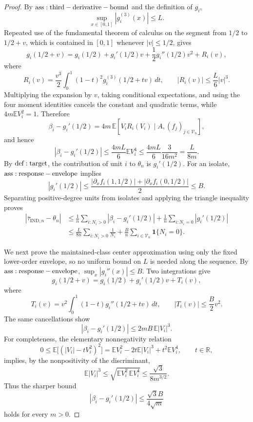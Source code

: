 \documentclass{article}
\begin{document}
\begin{proof}
By \({\rm ass:third-derivative-bound}\) and the definition of \(g_i\),
\[
 \sup_{x\in[0,1]}|g_i^{(3)}(x)|\le L.
\]
Repeated use of the fundamental theorem of calculus on the segment from \(1/2\) to \(1/2+v\), which is contained in \([0,1]\) whenever \(|v|\le1/2\), gives
\[
 g_i(1/2+v)
 =g_i(1/2)+g_i'(1/2)v+\frac12g_i''(1/2)v^2+R_i(v),
\]
where
\[
 R_i(v)=\frac{v^3}{2}\int_0^1(1-t)^2g_i^{(3)}(1/2+tv)\,dt,
 \qquad
 |R_i(v)|\le\frac L6|v|^3.
\]
Multiplying the expansion by \(v\), taking conditional expectations, and using the four moment identities cancels the constant and quadratic terms, while \(4m\mathbb E V_i^2=1\).  Therefore
\[
 \beta_i-g_i'(1/2)
 =4m\,\mathbb E\!\left[V_iR_i(V_i)\mid A,(f_j)_{j\in\mathcal V_n}\right],
\]
and hence
\[
 |\beta_i-g_i'(1/2)|
 \le\frac{4mL}{6}\mathbb E V_i^4
 \le\frac{4mL}{6}\frac3{16m^2}
 =\frac{L}{8m}.
\]
By \({\rm def:target}\), the contribution of unit \(i\) to \(\theta_n\) is \(g_i'(1/2)\).  For an isolate, \({\rm ass:response-envelope}\) implies
\[
 |g_i'(1/2)|
 \le\frac{|\partial_xf_i(1,1/2)|+|\partial_xf_i(0,1/2)|}{2}
 \le B.
\]
Separating positive-degree units from isolates and applying the triangle inequality proves
\[
\begin{aligned}
 |\bar\tau_{\mathrm{IND},n}-\theta_n|
 &\le\frac1n\sum_{i:N_i>0}|\beta_i-g_i'(1/2)|
       +\frac1n\sum_{i:N_i=0}|g_i'(1/2)|\\
 &\le\frac{L}{8n}\sum_{i:N_i>0}\frac1{N_i}
       +\frac Bn\sum_{i\in\mathcal V_n}\mathbf1\{N_i=0\}.
\end{aligned}
\]

We next prove the maintained-class center approximation using only the fixed lower-order envelope, so no uniform bound on \(L\) is needed along the sequence.  By \({\rm ass:response-envelope}\), \(\sup_x|g_i''(x)|\le B\).  Two integrations give
\[
 g_i(1/2+v)=g_i(1/2)+g_i'(1/2)v+T_i(v),
\]
where
\[
 T_i(v)=v^2\int_0^1(1-t)g_i''(1/2+tv)\,dt,
 \qquad
 |T_i(v)|\le\frac B2v^2.
\]
The same cancellations show
\[
 |\beta_i-g_i'(1/2)|\le2mB\,\mathbb E|V_i|^3.
\]
For completeness, the elementary nonnegativity relation
\[
 0\le\mathbb E\bigl[(|V_i|-tV_i^2)^2\bigr]
 =\mathbb EV_i^2-2t\mathbb E|V_i|^3+t^2\mathbb EV_i^4,
 \qquad t\in\mathbb R,
\]
implies, by the nonpositivity of the discriminant,
\[
 \mathbb E|V_i|^3\le
 \sqrt{\mathbb EV_i^2\,\mathbb EV_i^4}
 \le\frac{\sqrt3}{8m^{3/2}}.
\]
Thus the sharper bound
\[
 |\beta_i-g_i'(1/2)|\le\frac{\sqrt3 B}{4\sqrt m}
\]
holds for every \(m>0\).


\end{proof}
\end{document}
